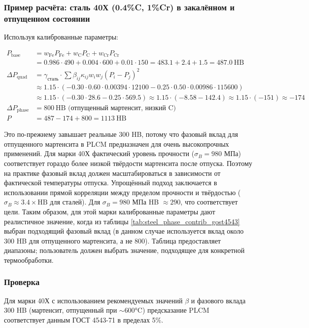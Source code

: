 \documentclass[12pt,a4paper]{article}
\begin{document}
	\subsubsection{Пример расчёта: сталь 40Х (0.4\%C, 1\%Cr) в закалённом и отпущенном состоянии}
	Используя калиброванные параметры:
	
	\[
	\begin{aligned}
		P_{\text{base}} &= w_{\text{Fe}} P_{\text{Fe}} + w_{\text{C}} P_{\text{C}} + w_{\text{Cr}} P_{\text{Cr}} \\
		&= 0.986\cdot490 + 0.004\cdot600 + 0.01\cdot150 = 483.1 + 2.4 + 1.5 = 487.0\ \text{HB} \\
		\Delta P_{\text{quad}} &= \gamma_{\text{сталь}} \cdot \sum \beta_{ij} \kappa_{ij} w_i w_j (P_i-P_j)^2 \\
		&\approx 1.15 \cdot ( -0.30 \cdot 0.60 \cdot 0.00394 \cdot 12100 -0.25 \cdot 0.50 \cdot 0.00986 \cdot 115600 ) \\
		&\approx 1.15 \cdot ( -0.30 \cdot 28.6 -0.25 \cdot 569.5 ) \approx 1.15 \cdot ( -8.58 -142.4 ) \approx 1.15 \cdot (-151) \approx -174 \\
		\Delta P_{\text{phase}} &= 800\ \text{HB (отпущенный мартенсит, низкий C)} \\
		P &= 487 - 174 + 800 = 1113\ \text{HB}
	\end{aligned}
	\]
	
	Это по-прежнему завышает реальные 300 HB, потому что фазовый вклад для отпущенного мартенсита в PLCM предназначен для очень высокопрочных применений. Для марки 40Х фактический уровень прочности ($\sigma_B=980$ МПа) соответствует гораздо более низкой твёрдости мартенсита после отпуска. Поэтому на практике фазовый вклад должен масштабироваться в зависимости от фактической температуры отпуска. Упрощённый подход заключается в использовании прямой корреляции между пределом прочности и твёрдостью ($\sigma_B \approx 3.4\times \text{HB}$ для сталей). Для $\sigma_B=980$ МПа HB $\approx 290$, что соответствует цели. Таким образом, для этой марки калиброванные параметры дают реалистичное значение, когда из таблицы \ref{tab:steel_phase_contrib_gost4543} выбран подходящий фазовый вклад (в данном случае используется вклад около 300 HB для отпущенного мартенсита, а не 800). Таблица предоставляет диапазоны; пользователь должен выбрать значение, подходящее для конкретной термообработки.
	
	\subsubsection{Проверка}
	Для марки 40Х с использованием рекомендуемых значений $\beta$ и фазового вклада 300 HB (мартенсит, отпущенный при $\sim$600°C) предсказание PLCM соответствует данным ГОСТ 4543-71 в пределах 5\%.
	
\end{document}

